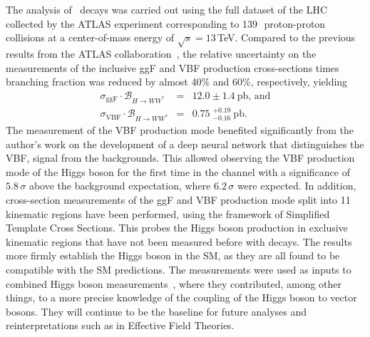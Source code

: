 The analysis of \HWW\ decays was carried out using the full \RunTwo dataset of the LHC collected by the ATLAS experiment corresponding to 139\,\ifb\ proton-proton collisions at a center-of-mass energy of $\sqrt{s} = 13\,$TeV. 
Compared to the previous \RunTwo results from the ATLAS collaboration~\cite{HIGG-2016-07}, the relative uncertainty on the measurements of the inclusive ggF and VBF production cross-sections times branching fraction was reduced by almost 40\% and 60\%, respectively, yielding 
\begin{eqnarray*}
    \sigma_{\mathrm{ggF}} \cdot \mathcal{B}_{H \to WW^{\ast}} &=& 12.0 \pm 1.4~\mathrm{pb}, \,\text{and} \\
    \sigma_{\mathrm{VBF}} \cdot \mathcal{B}_{H \to WW^{\ast}} &=& 0.75\;^{+0.19}_{-0.16}~\mathrm{pb}.
\end{eqnarray*}
The measurement of the VBF production mode benefited significantly from the author's work on the development of a deep neural network that distinguishes the VBF, \HWW signal from the backgrounds.
This allowed observing the VBF production mode of the Higgs boson for the first time in the \HWW channel with a significance of $5.8\,\sigma$ above the background expectation, where $6.2\,\sigma$ were expected.
In addition, cross-section measurements of the ggF and VBF production mode split into 11 kinematic regions have been performed, using the framework of Simplified Template Cross Sections. This probes the Higgs boson production in exclusive kinematic regions that have not been measured before with \HWW decays.
The results more firmly establish the Higgs boson in the SM, as they are all found to be compatible with the SM predictions.
The measurements were used as inputs to combined Higgs boson measurements~\cite{NaturePaper}, where they contributed, among other things, to a more precise knowledge of the coupling of the Higgs boson to vector bosons. 
They will continue to be the baseline for future analyses and reinterpretations such as in Effective Field Theories.

